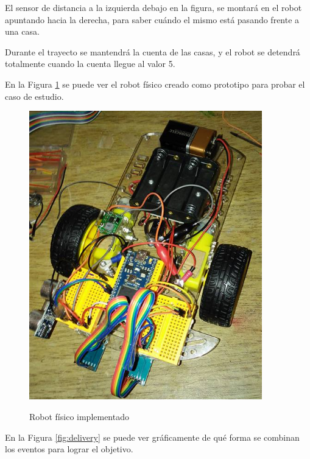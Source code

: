   El sensor de distancia a la izquierda debajo en la figura, se montará
en el robot apuntando hacia la derecha, para saber cuándo el mismo
está pasando frente a una casa.

  Durante el trayecto se mantendrá la cuenta de las casas, y el robot
se detendrá totalmente cuando la cuenta llegue al valor 5.

  En la Figura \ref{fig:robotfisico} se puede ver el
robot físico creado como prototipo para probar el caso de estudio.

\begin{figure}[hbtp]
\begin{center}
\caption{Robot físico implementado}
\includegraphics[width=0.9\textwidth]{graphs/alf.jpg}
\label{fig:robotfisico}
\end{center}
\end{figure}


  En la Figura \ref{fig:delivery} se puede ver gráficamente de qué forma
se combinan los eventos para lograr el objetivo.


